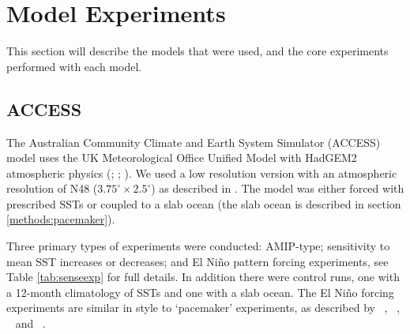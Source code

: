 \section{Model Experiments}

This section will describe the models that were used, and the core experiments 
performed with each model.


\subsection{ACCESS}

The Australian Community Climate and Earth System Simulator (ACCESS) model 
\citep{Bi2013} uses the UK Meteorological Office Unified Model with HadGEM2 
atmospheric physics (\citet{Davies2005}; \citet{Martin2010}; 
\citet{Bellouin2011}). We used a low resolution version with an atmospheric 
resolution of N48 ($3.75^{\circ} \times 2.5^{\circ}$) as described in 
\citet{Frauen2014}.  The model was either forced with prescribed SSTs or coupled 
to a slab ocean (the slab ocean is described in section 
\ref{methods:pacemaker}).

Three primary types of experiments were conducted: AMIP-type; sensitivity to 
mean SST increases or decreases; and El Ni{\~n}o pattern forcing experiments, 
see Table \ref{tab:senseexp} for full details. In addition there were control 
runs, one with a 12-month climatology of SSTs and one with a slab ocean.  The El 
Ni{\~n}o forcing experiments are similar in style to `pacemaker' experiments, as 
described by ~\citealt{Alexander1992}, ~\citealt{Alexander1992a}, 
~\citealt{Lau2000} and ~\citealt{Lu2011}. 

